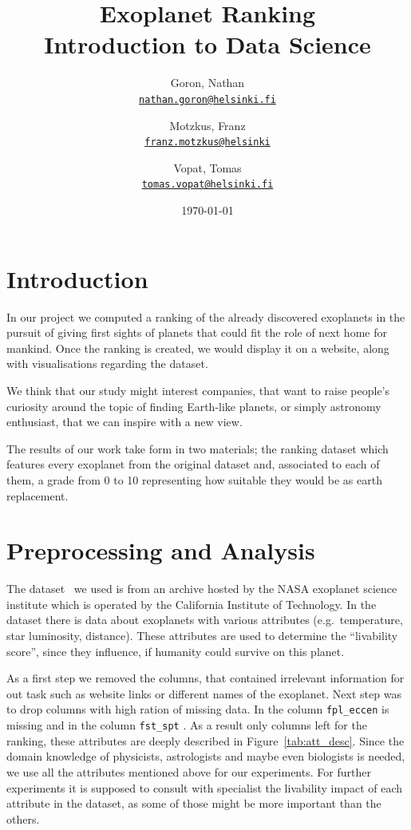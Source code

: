 \documentclass[12p]{article}
\title{Exoplanet Ranking \\\large Introduction to Data Science}
\date{\today}
\author{
    Goron, Nathan \\ \texttt{\href{mailto:nathan.goron@helsinki.fi}{nathan.goron@helsinki.fi}}
    \and 
    Motzkus, Franz \\ \texttt{\href{mailto:franz.motzkus@helsinki.fi}{franz.motzkus@helsinki}}
    \and 
    Vopat, Tomas  \\ \texttt{\href{mailto:tomas.vopat@helsinki.fi}{tomas.vopat@helsinki.fi}}
}
\begin{document}
\maketitle

\section{Introduction}

In our project we computed a ranking of the already discovered exoplanets in the pursuit of giving first sights of planets that could fit the role of next home for mankind.
Once the ranking is created, we would display it on a website, along with visualisations regarding the dataset.

We think that our study might interest companies, that want to raise people's curiosity around the topic of finding Earth-like planets, or simply astronomy enthusiast, that we can inspire with a new view.

The results of our work take form in two materials; the ranking dataset which features every exoplanet from the original dataset and, associated to each of them, a grade from 0 to 10 representing how suitable they would be as earth replacement.


\section{Preprocessing and Analysis}
The dataset~\cite{dataset} we used is from an archive hosted by the NASA exoplanet science institute which is operated by the California Institute of Technology. In the dataset there is data about  exoplanets with  various attributes (e.g.\ temperature, star luminosity, distance). These attributes are used to determine the ``livability score'', since they influence, if humanity could survive on this planet.

As a first step we removed the columns, that contained irrelevant information for out task such as website links or different names of the exoplanet. Next step was to drop columns with high ration of missing data. In the column \verb|fpl_eccen| is  missing and in the column \verb|fst_spt| . As a result only  columns left for the ranking, these attributes are deeply described in Figure~\ref{tab:att_desc}. Since the domain knowledge of physicists, astrologists and maybe even biologists is needed, we use all the attributes mentioned above for our experiments. For further experiments it is supposed to consult with specialist the livability impact of each attribute in the dataset, as some of those might be more important than the others.
\end{document}
